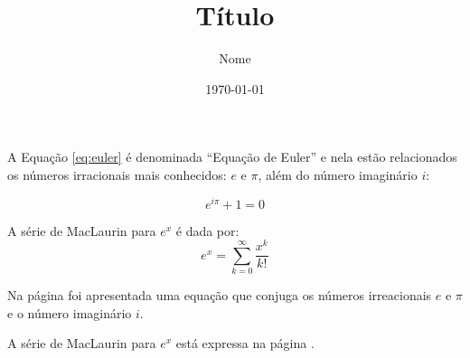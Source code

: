 \documentclass[17pt]{extarticle}
\title{Título}
\author{Nome}
\date{\today}
\begin{document}
\maketitle

A Equação \ref{eq:euler} é denominada ``Equação de Euler'' e nela estão relacionados os números irracionais mais conhecidos: $e$ e $\pi$, além do número imaginário $i$:

\begin{equation}
  \label{eq:euler}
  e^{i\pi} + 1 = 0
\end{equation}

A série de MacLaurin para $e^{x}$ é dada por:
\begin{equation}
  \label{eq:maclaurin}
  e^{x} = \sum_{k=0}^{\infty} \frac{x^{k}}{k!}
\end{equation}

\newpage

Na página \pageref{eq:euler} foi apresentada uma equação que conjuga os números irreacionais $e$ e $\pi$ e o número imaginário $i$.

A série de MacLaurin para $e^{x}$ está expressa na página \pageref{eq:maclaurin}.
\end{document}
